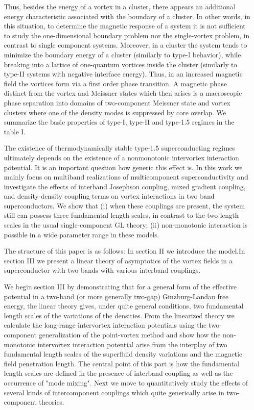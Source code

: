 Thus, besides the energy of a vortex in a cluster, there appears an additional 
energy characteristic associated with the boundary of a cluster. In other 
words, in this situation, to determine the magnetic response of a system it is 
not sufficient to study the one-dimensional boundary problem nor the 
single-vortex problem, in contrast to single component systems. Moreover, in a 
cluster the system tends to minimize the boundary energy of a cluster 
(similarly to type-I behavior), while breaking into a lattice of one-quantum 
vortices inside the cluster (similarly to type-II systems with negative 
interface energy). Thus, in an increased magnetic field the vortices form via 
a first order phase transition. A magnetic phase distinct from the vortex and 
Meissner states which then arises is a macroscopic phase separation into 
domains of two-component Meissner state and vortex clusters where one of the 
density modes is suppressed by core overlap. We summarize the basic properties 
of type-I, type-II and type-1.5 regimes in the table I.

The existence of thermodynamically stable type-1.5 superconducting regimes 
ultimately depends on the existence of a nonmonotonic intervortex interaction 
potential. It is an important question how generic this effect is. In this 
work we mainly focus on multiband realizations of multicomponent 
superconductivity and investigate the effects of interband Josephson coupling, 
mixed gradient coupling, and density-density coupling terms on vortex 
interactions in two band superconductors. We show that (i) when these 
couplings are present, the system still can possess three fundamental length 
scales, in contrast to the two length scales in the usual single-component GL 
theory; (ii) non-monotonic interaction is possible in a wide parameter range 
in these models.

The structure of this paper is as follows: In section II we introduce the 
model.In section III we present a linear theory of asymptotics of the vortex 
fields in a superconductor with two bands with various interband couplings.

We begin section III by demonstrating that for a general form of the effective 
potential in a two-band (or more generally two-gap) Ginzburg-Landau free 
energy, the linear theory gives, under quite general conditions, two 
fundamental length scales of the variations of the densities. From the 
linearized theory we calculate the long-range intervortex interaction 
potentials using the two-component generalization of the point-vortex method 
\cite{bib:19} and show how the non-monotonic intervortex interaction potential 
arise from the interplay of two fundamental length scales of the superfluid 
density variations and the magnetic field penetration length. The central 
point of this part is how the fundamental length scales are defined in the 
presence of interband coupling as well as the occurrence of "mode mixing". 
Next we move to quantitatively study the effects of several kinds of 
intercomponent couplings which quite generically arise in two-component 
theories.

